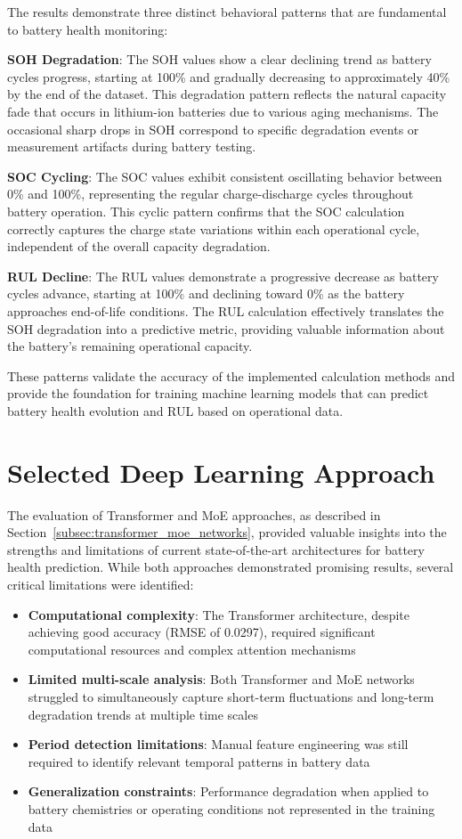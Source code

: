 The results demonstrate three distinct behavioral patterns that are fundamental to battery health monitoring:

\textbf{SOH Degradation}: The SOH values show a clear declining trend as battery cycles progress, starting at 100\% and gradually decreasing to approximately 40\% by the end of the dataset. This degradation pattern reflects the natural capacity fade that occurs in lithium-ion batteries due to various aging mechanisms. The occasional sharp drops in SOH correspond to specific degradation events or measurement artifacts during battery testing.

\textbf{SOC Cycling}: The SOC values exhibit consistent oscillating behavior between 0\% and 100\%, representing the regular charge-discharge cycles throughout battery operation. This cyclic pattern confirms that the SOC calculation correctly captures the charge state variations within each operational cycle, independent of the overall capacity degradation.

\textbf{RUL Decline}: The RUL values demonstrate a progressive decrease as battery cycles advance, starting at 100\% and declining toward 0\% as the battery approaches end-of-life conditions. The RUL calculation effectively translates the SOH degradation into a predictive metric, providing valuable information about the battery's remaining operational capacity.

These patterns validate the accuracy of the implemented calculation methods and provide the foundation for training machine learning models that can predict battery health evolution and RUL based on operational data.

\section{Selected Deep Learning Approach}
\label{sec:timesnet_model}

The evaluation of Transformer and MoE approaches, as described in Section~\ref{subsec:transformer_moe_networks}, provided valuable insights into the strengths and limitations of current state-of-the-art architectures for battery health prediction. While both approaches demonstrated promising results, several critical limitations were identified:

\begin{itemize}
    \item \textbf{Computational complexity}: The Transformer architecture, despite achieving good accuracy (RMSE of 0.0297), required significant computational resources and complex attention mechanisms
    \item \textbf{Limited multi-scale analysis}: Both Transformer and MoE networks struggled to simultaneously capture short-term fluctuations and long-term degradation trends at multiple time scales
    \item \textbf{Period detection limitations}: Manual feature engineering was still required to identify relevant temporal patterns in battery data
    \item \textbf{Generalization constraints}: Performance degradation when applied to battery chemistries or operating conditions not represented in the training data
\end{itemize}

